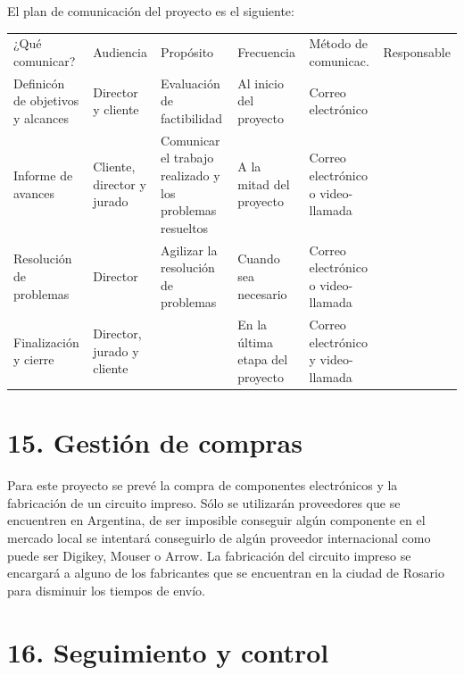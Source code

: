 \documentclass[11pt]{charter}
\begin{document}
El plan de comunicación del proyecto es el siguiente:

\begin{table}[htpb]
\centering
\begin{tabularx}{\linewidth}{@{}|X|C{2.4cm}|C{3cm}|C{1.8cm}|C{2cm}|C{2.1cm}|@{}}
\hline
{} 
           \\ \hline
{} 
¿Qué comunicar?					& Audiencia			& Propósito					& Frecuencia & Método de comunicac. & Responsable \\ \hline
Definicón de objetivos y alcances& Director y cliente	& Evaluación de factibilidad & Al inicio del proyecto & Correo electrónico & \authorname \\ \hline
Informe de avances				& Cliente, director y jurado & Comunicar el trabajo realizado y los problemas resueltos  & A la mitad del proyecto & Correo electrónico o video-llamada	& \authorname \\ \hline
Resolución de problemas			& Director          & Agilizar la resolución de problemas & Cuando sea necesario & Correo electrónico o video-llamada & \authorname	\\ \hline
Finalización y cierre			& Director, jurado y cliente &  & En la última etapa del proyecto & Correo electrónico y video-llamada & \authorname\\ \hline
\end{tabularx}
\end{table}

\section{15. Gestión de compras}
\label{sec:compras}

	Para este proyecto se prevé la compra de componentes electrónicos y la fabricación de un circuito impreso. Sólo se utilizarán proveedores que se encuentren en Argentina, de ser imposible conseguir algún componente en el mercado local se intentará conseguirlo de algún proveedor internacional como puede ser Digikey, Mouser o Arrow.
	La fabricación del circuito impreso se encargará a alguno de los fabricantes que se encuentran en la ciudad de Rosario para disminuir los tiempos de envío.

\section{16. Seguimiento y control}
\label{sec:seguimiento}
\end{document}
